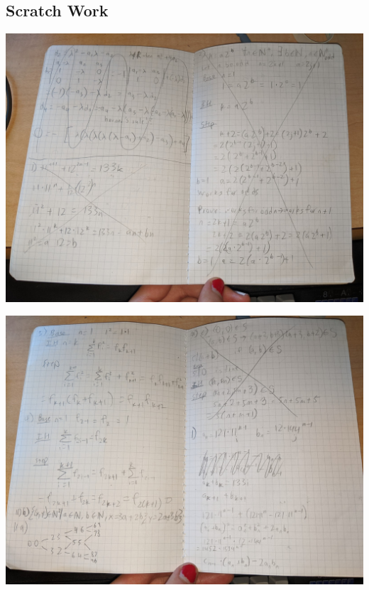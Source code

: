 \documentclass{article}
\numberwithin{subcase}{case}
\begin{document}
\begin{landscape}
    \section{Scratch Work}

    \centering
    \thispagestyle{empty}
    \includegraphics[width=0.95\linewidth]{1.jpg}

    \pagebreak
    
    \thispagestyle{empty}
    \includegraphics[width=0.95\linewidth]{2.jpg}
    \pagebreak
    

\end{landscape}
\end{document}
